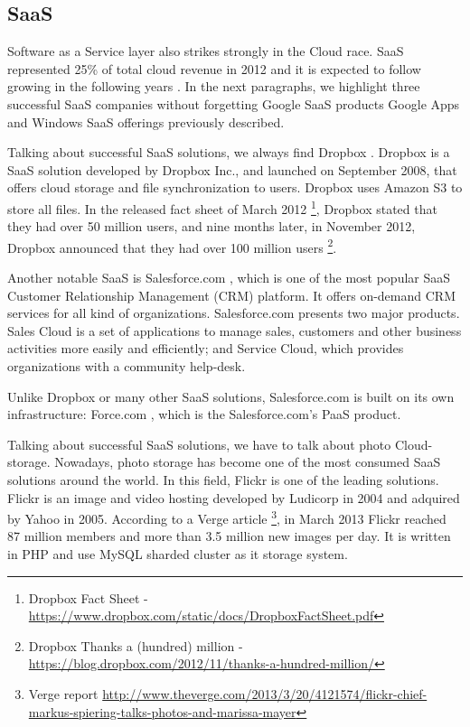 \subsection{SaaS}
Software as a Service layer also strikes strongly in the Cloud race. SaaS represented 25\% of total cloud revenue in 2012 and it is expected to follow growing in the following years \cite{aslett2013451}. In the next paragraphs, we highlight three successful SaaS companies without forgetting Google SaaS products Google Apps and Windows SaaS offerings previously described.
\par
Talking about successful SaaS solutions, we always find Dropbox \cite{Dropbox}. Dropbox is a SaaS solution developed by Dropbox Inc., and launched on September 2008, that offers cloud storage and file synchronization to users. Dropbox uses Amazon S3 to store all files. 
In the released fact sheet of March 2012 \footnote{Dropbox {F}act {S}heet - \url{https://www.dropbox.com/static/docs/DropboxFactSheet.pdf}}, Dropbox stated that they had over 50 million users, and nine months later, in November 2012, Dropbox announced that they had over 100 million users \footnote{Dropbox {T}hanks a (hundred) million - \url{https://blog.dropbox.com/2012/11/thanks-a-hundred-million/}}.
\par
Another notable SaaS is Salesforce.com \cite{Salesforce.com}, which is one of the most popular SaaS Customer Relationship Management (CRM) platform. It offers on-demand CRM services for all kind of organizations. Salesforce.com presents two major products. Sales Cloud is a set of applications to manage sales, customers and other business activities more easily and efficiently; and Service Cloud, which provides organizations with a community help-desk.
\par
Unlike Dropbox or many other SaaS solutions, Salesforce.com is built on its own infrastructure: Force.com \cite{Force.com}, which is the Salesforce.com's PaaS product.
\par
Talking about successful SaaS solutions, we have to talk about photo Cloud-storage. Nowadays, photo storage has become one of the most consumed SaaS solutions around the world. In this field, Flickr is one of the leading solutions. Flickr is an image and video hosting developed by Ludicorp in 2004 and adquired by Yahoo in 2005. According to a Verge article \footnote{Verge report \url{http://www.theverge.com/2013/3/20/4121574/flickr-chief-markus-spiering-talks-photos-and-marissa-mayer}}, in March 2013 Flickr reached 87 million members and more than 3.5 million new images per day. It is written in PHP and use MySQL sharded cluster as it storage system.


